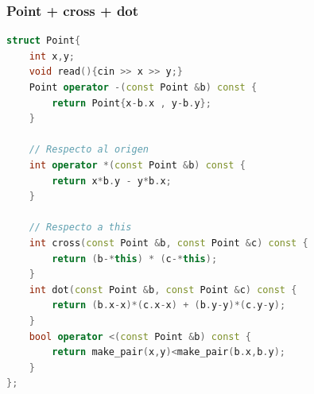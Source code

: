 \subsubsection{Point + cross + dot}
\begin{lstlisting}[style=mystyle, language=C++]
struct Point{
	int x,y;
	void read(){cin >> x >> y;}
	Point operator -(const Point &b) const {
		return Point{x-b.x , y-b.y};
	}

	// Respecto al origen
	int operator *(const Point &b) const {
		return x*b.y - y*b.x;
	}

	// Respecto a this
	int cross(const Point &b, const Point &c) const {
		return (b-*this) * (c-*this);
	}
	int dot(const Point &b, const Point &c) const {
		return (b.x-x)*(c.x-x) + (b.y-y)*(c.y-y);
	}
	bool operator <(const Point &b) const {
		return make_pair(x,y)<make_pair(b.x,b.y);
	}
};
\end{lstlisting}
